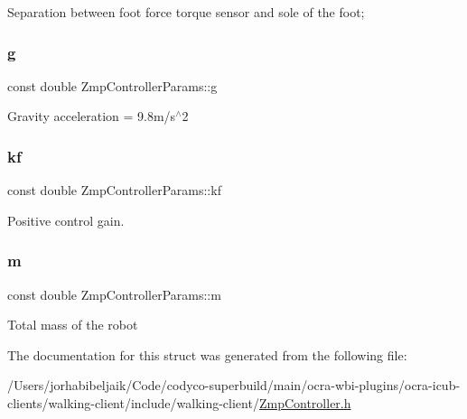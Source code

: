 Separation between foot force torque sensor and sole of the foot; \hypertarget{structZmpControllerParams_af97a6bcc6b60e8372dd444d695d705f7}{}\label{structZmpControllerParams_af97a6bcc6b60e8372dd444d695d705f7} 
\subsubsection{\texorpdfstring{g}{g}}
{\footnotesize\ttfamily const double Zmp\+Controller\+Params\+::g}

Gravity acceleration = 9.\+8m/s$^\wedge$2 \hypertarget{structZmpControllerParams_a6138cbf819799519abd3864bd8bf05cf}{}\label{structZmpControllerParams_a6138cbf819799519abd3864bd8bf05cf} 
\subsubsection{\texorpdfstring{kf}{kf}}
{\footnotesize\ttfamily const double Zmp\+Controller\+Params\+::kf}

Positive control gain. \hypertarget{structZmpControllerParams_a1a3eea24e276953f2e74c4066b24106c}{}\label{structZmpControllerParams_a1a3eea24e276953f2e74c4066b24106c} 
\subsubsection{\texorpdfstring{m}{m}}
{\footnotesize\ttfamily const double Zmp\+Controller\+Params\+::m}

Total mass of the robot 

The documentation for this struct was generated from the following file\+:\begin{DoxyCompactItemize}
\item 
/\+Users/jorhabibeljaik/\+Code/codyco-\/superbuild/main/ocra-\/wbi-\/plugins/ocra-\/icub-\/clients/walking-\/client/include/walking-\/client/\hyperlink{ZmpController_8h}{Zmp\+Controller.\+h}\end{DoxyCompactItemize}

